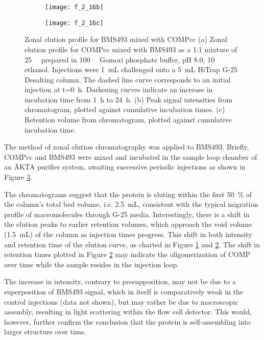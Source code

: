 \begin{refsection}
\begin{figure}[h!]
    \begin{subfigure}[b]{0.5\textwidth}
        \texttt{[image: f\_2\_16b]}
        \caption{}
        \label{fig:ze_intensity}
    \end{subfigure}
    \begin{subfigure}[b]{0.45\textwidth}
        \texttt{[image: f\_2\_16c]}
        \caption{}
        \label{fig:ze_retention_times}
    \end{subfigure} \caption{Zonal elution profile for BMS493 mixed with
    COMPcc (a) Zonal elution profile for COMPcc mixed with BMS493 as a 1:1
        mixture of \SI{25}{\micro\moLar} prepared in \SI{100}{\milli\moLar}
        Gomori phosphate buffer, pH 8.0, \SI{10}{\volper} ethanol. Injections
        were \SI{1}{\mL} challenged onto a \SI{5}{\mL} HiTrap G-25 Desalting column.
        The dashed line curve corresponds to an initial injection at
        t=\SI{0}{\hour}. Darkening curves indicate an increase in incubation
        time from \SI{1}{\hour} to \SI{24}{\hour}. (b) Peak signal intensities
        from chromatogram, plotted against cumulative incubation times. (c)
        Retention volume from chromatogram, plotted against cumulative
        incubation time.
    }\label{fig:zonal_elution_report}
\end{figure}
The method of zonal elution chromatography was applied to BMS493. Briefly,
COMPcc and BMS493 were mixed and incubated in the sample loop chamber of an
\"{A}KTA purifier system, awaiting successive periodic injections as shown in
Figure \ref{fig:zonal_elution_report}. 

The chromatograms suggest that the protein is eluting within the first
\SI{50}{\percent} of the column's total bed volume, i.e. \SI{2.5}{\mL},
consistent with the typical migration profile of macromolecules through G-25
media.  Interestingly, there is a shift in the elution peaks to earlier
retention volumes, which approach the void volume (\SI{1.5}{\mL}) of the column
as injection times progress. This shift in both intensity and retention time of
the elution curve, as charted in Figure \ref{fig:ze_intensity} and
\ref{fig:ze_retention_times}. The shift in retention times plotted in Figure
\ref{fig:ze_retention_times} may indicate the oligomerization of COMP over time
while the sample resides in the injection loop.

The increase in intensity, contrary to presupposition, may not be due to a
superposition of BMS493 signal, which in itself is comparatively weak in the
control injections (data not shown), but may rather be due to macroscopic
assembly, resulting in light scattering within the flow cell detector. This
would, however, further confirm the conclusion that the protein is
self-assembling into larger structure over time.


\end{refsection}
